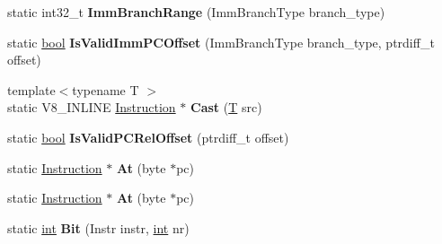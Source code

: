 \begin{DoxyCompactItemize}
\item 
\mbox{\label{classv8_1_1internal_1_1Instruction_a7b095e92ba5b03354df8314085bd6f62}} 
static int32\+\_\+t {\bfseries Imm\+Branch\+Range} (Imm\+Branch\+Type branch\+\_\+type)
\item 
\mbox{\label{classv8_1_1internal_1_1Instruction_a584e16e6e6c7f84789ae310842a51f8a}} 
static \mbox{\hyperlink{classbool}{bool}} {\bfseries Is\+Valid\+Imm\+P\+C\+Offset} (Imm\+Branch\+Type branch\+\_\+type, ptrdiff\+\_\+t offset)
\item 
\mbox{\label{classv8_1_1internal_1_1Instruction_aecb7a04edf284a6cbebb48c86792fdfd}} 
{\footnotesize template$<$typename T $>$ }\\static V8\+\_\+\+I\+N\+L\+I\+NE \mbox{\hyperlink{classv8_1_1internal_1_1Instruction}{Instruction}} $\ast$ {\bfseries Cast} (\mbox{\hyperlink{classv8_1_1internal_1_1torque_1_1T}{T}} src)
\item 
\mbox{\label{classv8_1_1internal_1_1Instruction_a1c55ff4d0489af239bf15fba112ecfc1}} 
static \mbox{\hyperlink{classbool}{bool}} {\bfseries Is\+Valid\+P\+C\+Rel\+Offset} (ptrdiff\+\_\+t offset)
\item 
\mbox{\label{classv8_1_1internal_1_1Instruction_ababb29269d211ebdc2c9c772e06dc85e}} 
static \mbox{\hyperlink{classv8_1_1internal_1_1Instruction}{Instruction}} $\ast$ {\bfseries At} (byte $\ast$pc)
\item 
\mbox{\label{classv8_1_1internal_1_1Instruction_ababb29269d211ebdc2c9c772e06dc85e}} 
static \mbox{\hyperlink{classv8_1_1internal_1_1Instruction}{Instruction}} $\ast$ {\bfseries At} (byte $\ast$pc)
\item 
\mbox{\label{classv8_1_1internal_1_1Instruction_a72f9d7a469c17eea228fe628530157e4}} 
static \mbox{\hyperlink{classint}{int}} {\bfseries Bit} (Instr instr, \mbox{\hyperlink{classint}{int}} nr)
\item 
\mbox{\label{classv8_1_1internal_1_1Instruction_af5577086b166e1c6f418c077ab935a9c}} 

\end{DoxyCompactItemize}
